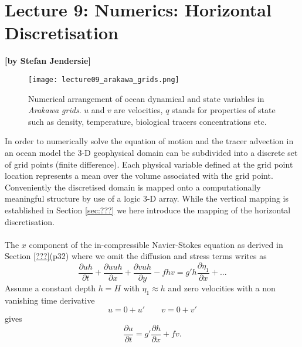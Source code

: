 
\section{Lecture 9: Numerics: Horizontal Discretisation}
\begin{flushright}\textbf{[by Stefan Jendersie]}\end{flushright}

\begin{figure}
\begin{center}
\texttt{[image: lecture09\_arakawa\_grids.png]}
\label{fig:arakawa_grid}
\caption{Numerical arrangement of ocean dynamical and state variables in \textit{Arakawa grids}. $u$ and $v$ are velocities, $q$ stands for properties of state such as density, temperature, biological tracers concentrations etc. }
\end{center}
\end{figure}
%
In order to numerically solve the equation of motion and the tracer advection in an ocean model the 3-D geophysical domain can be subdivided into a discrete set of grid points (finite difference).  Each physical variable defined at the grid point location represents a mean over the volume associated with the grid point. Conveniently the discretised domain is mapped onto a computationally meaningful structure by use of a logic 3-D array.  While the vertical mapping is established in Section \ref{sec:???} we here introduce the mapping of the horizontal discretisation.
%
\paragraph*{}
The $x$ component of the in-compressible Navier-Stokes equation as derived in Section \ref{???}(p32) where we omit the diffusion and stress terms writes as
\begin{equation}
  \frac{\partial uh}{\partial t} + \frac{\partial uuh}{\partial x} + \frac{\partial vuh}{\partial y} - fhv = g' h \frac{\partial \eta_1}{\partial x} + ...
\end{equation}
Assume a constant depth $h=H$ with $\eta_1\approx h$ and zero velocities with a non vanishing time derivative
\begin{equation}
     u=0+u' \qquad v=0+v'
\end{equation}
gives
\begin{equation}
\frac{\partial u}{\partial t}  = g'\frac{\partial h}{\partial x} + fv. \label{eqn:uEOM}
\end{equation}

